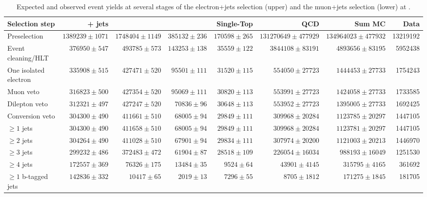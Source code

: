 \begin{table}
  \centering
   \caption{Expected and observed event yields at several stages of the electron+jets selection (upper) and
   the muon+jets selection (lower) at \TeV.}
    \label{tab:cut_flow_8TeV}
    \resizebox{\columnwidth}{!} {
    \begin{tabular}{lrrrrrrr}
    \hline
    \hline
	Selection step & \ttbar + jets & \WpJets & \ZpJets & Single-Top & QCD & Sum MC & Data \\
	\hline
	Preselection  &  $1389239 \pm 1071$ &  $1748404 \pm 1149$ &  $385132 \pm 236$ &  $170598 \pm 265$ &  $131270649 \pm 477929$ &  $134964023 \pm 477932$ &  13219192 \\ 
	Event cleaning/HLT  &  $376950 \pm 547$ &  $493785 \pm 573$ &  $143253 \pm 138$ &  $35559 \pm 122$ &  $3844108 \pm 83191$ &  $4893656 \pm 83195$ &  5952438 \\ 
	One isolated electron  &  $335908 \pm 515$ &  $427471 \pm 520$ &  $95501 \pm 111$ &  $31520 \pm 115$ &  $554050 \pm 27723$ &  $1444453 \pm 27733$ &  1754243 \\ 
	Muon veto  &  $316823 \pm 500$ &  $427354 \pm 520$ &  $95069 \pm 111$ &  $30820 \pm 113$ &  $553991 \pm 27723$ &  $1424058 \pm 27733$ &  1733585 \\ 
	Dilepton veto  &  $312321 \pm 497$ &  $427247 \pm 520$ &  $70836 \pm 96$ &  $30648 \pm 113$ &  $553952 \pm 27723$ &  $1395005 \pm 27733$ &  1692425 \\ 
	Conversion veto  &  $304300 \pm 490$ &  $411661 \pm 510$ &  $68005 \pm 94$ &  $29849 \pm 111$ &  $309968 \pm 20284$ &  $1123785 \pm 20297$ &  1447105 \\ 
	$\geq 1$ jets  &  $304300 \pm 490$ &  $411658 \pm 510$ &  $68005 \pm 94$ &  $29849 \pm 111$ &  $309968 \pm 20284$ &  $1123781 \pm 20297$ &  1447105 \\ 
	$\geq 2$ jets  &  $304264 \pm 490$ &  $411028 \pm 510$ &  $67901 \pm 94$ &  $29834 \pm 111$ &  $307974 \pm 20200$ &  $1121003 \pm 20213$ &  1446970 \\ 
	$\geq 3$ jets  &  $299232 \pm 486$ &  $372483 \pm 472$ &  $61904 \pm 87$ &  $28518 \pm 109$ &  $226054 \pm 16034$ &  $988193 \pm 16049$ &  1251530 \\ 
	$\geq 4$ jets  &  $172557 \pm 369$ &  $76326 \pm 175$ &  $13484 \pm 35$ &  $9524 \pm 64$ &  $43901 \pm 4145$ &  $315795 \pm 4165$ &  361692 \\ 
	$\geq 1$ b-tagged jets  &  $142836 \pm 332$ &  $10417 \pm 65$ &  $2019 \pm 13$ &  $7296 \pm 55$ &  $8705 \pm 1812$ &  $171275 \pm 1845$ &  181705 \\ 

\end{tabular}}
\end{table}
